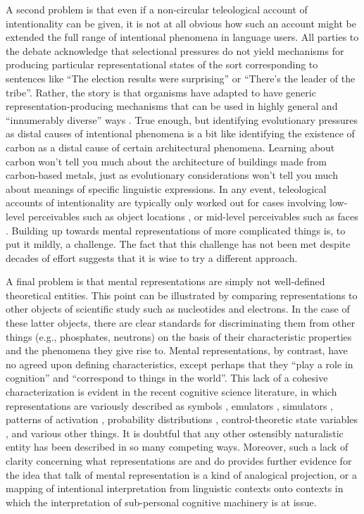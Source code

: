A second problem is that even if a non-circular teleological account of intentionality can be given, it is not at all obvious how such an account might be extended the full range of intentional phenomena in language users. All parties to the debate acknowledge that selectional pressures do not yield mechanisms for producing particular representational states of the sort corresponding to sentences like ``The election results were surprising'' or ``There's the leader of the tribe''. Rather, the story is that organisms have adapted to have generic representation-producing mechanisms that can be used in highly general and ``innumerably diverse'' ways \citep[][p. 292]{Millikan:1989}. True enough, but identifying evolutionary pressures as distal causes of intentional phenomena is a bit like identifying the existence of carbon as a distal cause of certain architectural phenomena. Learning about carbon won't tell you much about the architecture of buildings made from carbon-based metals, just as evolutionary considerations won't tell you much about meanings of specific linguistic expressions. In any event, teleological accounts of intentionality are typically only worked out for cases involving low-level perceivables such as object locations \citep{Millikan:1989}, or mid-level perceivables such as faces \citep{Dennett:1987}. Building up towards mental representations of more complicated things is, to put it mildly, a challenge. The fact that this challenge has not been met despite decades of effort suggests that it is wise to try a different approach.

A final problem is that mental representations are simply not well-defined theoretical entities. This point can be illustrated by comparing representations to other objects of scientific study such as nucleotides and electrons. In the case of these latter objects, there are clear standards for discriminating them from other things (e.g., phosphates, neutrons) on the basis of their characteristic properties and the phenomena they give rise to. Mental representations, by contrast, have no agreed upon defining characteristics, except perhaps that they ``play a role in cognition'' and ``correspond to things in the world''. This lack of a cohesive characterization is evident in the recent cognitive science literature, in which representations are variously described as symbols \citep{Fodor:1998}, emulators \citep{Grush:2004}, simulators \citep{Barsalou:1999}, patterns of activation \citep{McClelland:2010}, probability distributions \citep{Goodman:2015} , control-theoretic state variables \citep{Eliasmith:2003,Eliasmith:2013}, and various other things. It is doubtful that any other ostensibly naturalistic entity has been described in so many competing ways. Moreover, such a lack of clarity concerning what representations are and do provides further evidence for the idea that talk of mental representation is a kind of analogical projection, or a mapping of intentional interpretation from linguistic contexts onto contexts in which the interpretation of sub-personal cognitive machinery is at issue.

